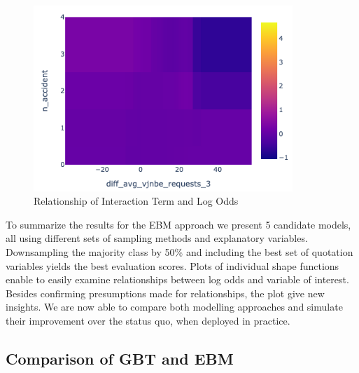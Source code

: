 \documentclass[12pt,titlepage]{article}
\begin{document}
\begin{figure}[H]
    \centerline{\includegraphics[height=7cm]{shape_2dim.png}}
    \caption{Relationship of Interaction Term and Log Odds}
    \label{fig:shape2dim}
\end{figure}
\noindent
To summarize the results for the EBM approach we present 5 candidate models, all using different sets of sampling methods and explanatory variables. Downsampling the majority class by 50\% and including the best set of quotation variables yields the best evaluation scores. Plots of individual shape functions enable to easily examine relationships between log odds and variable of interest. Besides confirming presumptions made for relationships, the plot give new insights. We are now able to compare both modelling approaches and simulate their improvement over the status quo, when deployed in practice. \\

\subsection{Comparison of GBT and EBM}
\end{document}
